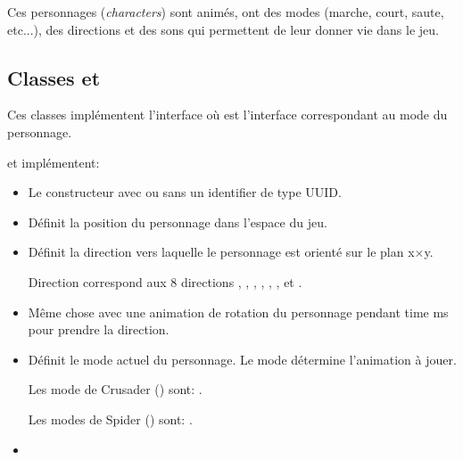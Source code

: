 \documentclass[11pt]{article}
\begin{document}
Ces personnages (\textit{characters}) sont animés, ont des modes (marche, court, saute, etc...), des directions et des sons qui permettent de leur donner vie dans le jeu.

\subsection*{Classes  et }

Ces classes implémentent l'interface  où  est l'interface correspondant au mode du personnage.


 et  implémentent:

\begin{itemize}

    \item Le constructeur avec ou sans un identifier de type UUID.

\item {}

Définit la position du personnage dans l’espace du jeu.

\item {}

Définit la direction vers laquelle le personnage est orienté sur le plan x$\times$y.

Direction correspond aux 8 directions , , , 
, , ,  et .

\item {}

Même chose avec une animation de rotation du personnage pendant time ms pour prendre la direction.

\item {}

Définit le mode actuel du personnage.
Le mode détermine l'animation à jouer.

Les mode de Crusader () sont:
.

Les modes de Spider () sont:
.

\item {}


\end{itemize}
\end{document}
